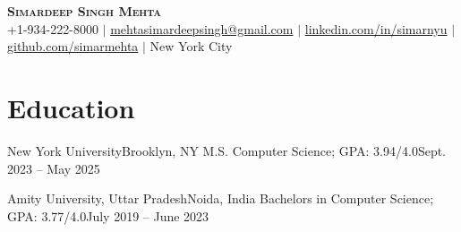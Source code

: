 \newcommand{\resumeProjectHeading}[2]{
    \item
    \begin{tabular*}{0.97\textwidth}{l@{\extracolsep{\fill}}r}
      \small#1 & #2 \\
    \end{tabular*}\vspace{-7pt}
}

\newcommand{\resumeSubItem}[1]{\resumeItem{#1}\vspace{-4pt}}

\renewcommand\labelitemii{$\vcenter{\hbox{\tiny$\bullet$}}$}

\newcommand{\resumeSubHeadingListStart}{\begin{itemize}[leftmargin=0.15in, label={}]}
\newcommand{\resumeSubHeadingListEnd}{\end{itemize}}
\newcommand{\resumeItemListStart}{\begin{itemize}}
\newcommand{\resumeItemListEnd}{\end{itemize}\vspace{-5pt}}




\begin{center}
    \textbf{\Huge \scshape Simardeep Singh Mehta} \\ \vspace{1pt}
    \small +1-934-222-8000 $|$ \href{mailto:mehtasimardeepsingh@gmail.com}{{mehtasimardeepsingh@gmail.com}} $|$ 
    \href{https://linkedin.com/in/simarnyu}{{linkedin.com/in/simarnyu}} $|$
    \href{https://github.com/simarmehta}{{github.com/simarmehta}} $|$ New York City
\end{center}

\section{Education}
  \resumeSubHeadingListStart
    \resumeSubheading
      {New York University}{Brooklyn, NY}
      {M.S. Computer Science; GPA: 3.94/4.0}{Sept. 2023 -- May 2025}
      \resumeItemListStart
      \resumeItemListEnd
    \resumeSubheading
      {Amity University, Uttar Pradesh}{Noida, India}
      {Bachelors in Computer Science; GPA: 3.77/4.0}{July 2019 -- June 2023}
  \resumeSubHeadingListEnd

